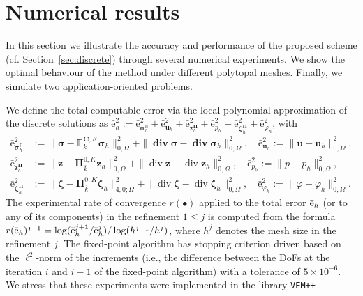 \documentclass[fleqn,a4paper]{cas-sc}
\newcommand\vdiv{\mathop{\mathrm{div}}\nolimits}
\newcommand\bdiv{\mathop{\mathbf{div}}\nolimits}
\newcommand{\bC}{\mathbf{C}}
\newcommand{\bu}{\boldsymbol{u}}
\newcommand{\bz}{\boldsymbol{z}}
\newcommand{\bzeta}{\boldsymbol{\zeta}}
\newcommand{\bPi}{\boldsymbol{\Pi}}
\newcommand{\0}{\boldsymbol{0}}
\newcommand\bbPi{\mathbb{\Pi}}
\newcommand\bsigma{\boldsymbol{\sigma}}
\numberwithin{equation}{section}
\numberwithin{figure}{section}
\begin{document}
\section{Numerical results}\label{sec:results}
In this section we illustrate the accuracy and performance of the proposed scheme (cf. Section~\ref{sec:discrete}) through several numerical experiments.  We show the optimal behaviour of the method under different polytopal meshes. Finally, we simulate two application-oriented problems.  

We define the total computable error via the local polynomial approximation of the discrete solutions as $\bar{\mathrm{e}}_{h}^2 := \bar{\text{e}}_{\bsigma_h^{\bbPi}}^2+\bar{\text{e}}_{\bu_h}^2+\bar{\text{e}}_{\bz_h^{\bPi}}^2+\bar{\text{e}}_{p_h}^2+\bar{\text{e}}_{\bzeta_h^{\bPi}}^2+\bar{\text{e}}_{\varphi_h}^2$, with
\begin{align*}
    \bar{\text{e}}_{\bsigma_h^{\bbPi}}^2 &:= \|\bsigma-\bbPi_{k}^{\bC,K}\bsigma_h\|_{0,\Omega}^2 + \|\bdiv \bsigma-\bdiv \bsigma_h\|_{0,\Omega}^2, \quad
    \bar{\text{e}}_{\bu_h}^2 := \|\bu-\bu_h\|_{0,\Omega}^2, \\
    \bar{\text{e}}_{\bz_h^{\bPi}}^2 &:= \|\bz-\bPi_{\overline{k}}^{0,K}\bz_h\|_{0,\Omega}^2 + \|\vdiv \bz - \vdiv \bz_h\|_{0,\Omega}^2, \quad
    \bar{\text{e}}_{p_h}^2 := \|p-p_h\|_{0,\Omega}^2, \\
    \bar{\text{e}}_{\bzeta_h^{\bPi}}^2 &:= \|\bzeta-\bPi_{\overline{k}}^{0,K}\bzeta_h\|_{4,0;\Omega}^2 + \|\vdiv \bzeta - \vdiv \bzeta_h\|_{0,\Omega}^2,\quad
    \bar{\text{e}}_{\varphi_h}^2 := \|\varphi-\varphi_h\|_{0,\Omega}^2.
\end{align*}
The experimental rate of convergence $r(\bullet)$ applied to the total error {$\bar{\textnormal{e}}_h$} (or to any of its components) in the refinement $1\leq j$ is computed from the formula {$r(\bar{\textnormal{e}}_h)^{j+1} = \log(\bar{\textnormal{e}}_h^{j+1}/\bar{\textnormal{e}}_h^{j})/\log(h^{j+1}/h^{j})$}, where $h^j$ denotes the mesh size in the refinement $j$. The fixed-point algorithm has stopping criterion driven based on the $\ell^2$-norm of the increments (i.e., the difference between the DoFs at the iteration $i$ and $i-1$ of the fixed-point algorithm) with a tolerance of $5\times 10^{-6}$. We stress that these experiments were  implemented in the library \texttt{VEM++}  \cite{dassi2023vem++}.
\end{document}
